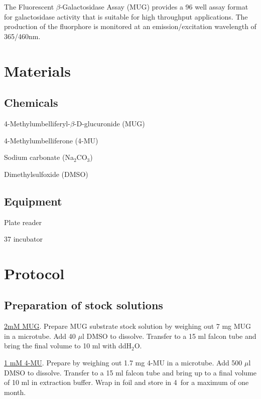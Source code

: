 \documentclass[a4paper,12pt]{article}
\newenvironment{packed_enum}{
\begin{enumerate}
  \setlength{\itemsep}{1pt}
  \setlength{\parskip}{0pt}
  \setlength{\parsep}{0pt}
}{\end{enumerate}}
\begin{document}
The Fluorescent $\beta$-Galactosidase Assay (MUG) provides a 96 well assay format for galactosidase activity that is suitable for high throughput applications.  The production of the fluorphore is monitored at an emission/excitation wavelength of 365/460nm.
\section{Materials}
	\subsection{Chemicals}
	\begin{packed_enum}
	\item 4-Methylumbelliferyl-{$\beta$}-D-glucuronide (MUG)
	\item 4-Methylumbelliferone (4-MU)
	\item Sodium carbonate (Na$_{2}$CO$_{3}$)
	\item Dimethylsulfoxide (DMSO)
	\end{packed_enum}
		
	\subsection{Equipment}
	\begin{packed_enum}
	\item Plate reader
	\item 37 {\textcelsius} incubator
	\end{packed_enum}
 
\section{Protocol}
	\subsection{Preparation of stock solutions}
	\begin{packed_enum}
	\item {\underline{2mM MUG}}. Prepare MUG substrate stock solution by weighing out 7 mg MUG in a microtube. Add 40 $\mu$l DMSO to dissolve. Transfer to a 15 ml falcon tube and bring the final volume to 10 ml with ddH$_{2}$O.
	\item \underline{1 mM 4-MU}. Prepare by weighing out 1.7 mg 4-MU in a microtube. Add 500 $\mu$l DMSO to dissolve. Transfer to a 15 ml falcon tube and bring up to a final volume of 10 ml in extraction buffer. Wrap in foil and store in 4\textcelsius\ for a maximum of one month.
	\end{packed_enum}
\end{document}
